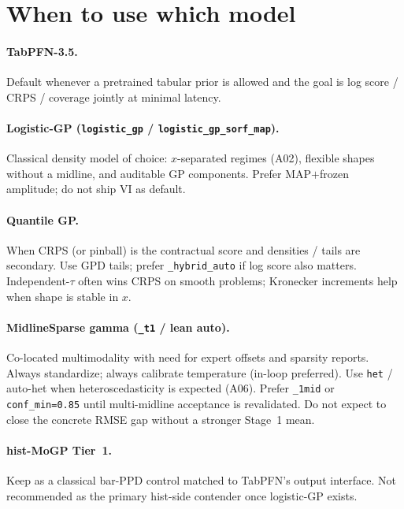 \documentclass[11pt,a4paper]{article}
\theoremstyle{definition}
\begin{document}
\section{When to use which model}
\label{sec:usecases}

\paragraph{TabPFN-3.5.}
Default whenever a pretrained tabular prior is allowed and the goal is
log score / CRPS / coverage jointly at minimal latency.

\paragraph{Logistic-GP (\texttt{logistic\_gp} / \texttt{logistic\_gp\_sorf\_map}).}
Classical density model of choice: $x$-separated regimes (A02), flexible
shapes without a midline, and auditable GP components. Prefer MAP$+$frozen
amplitude; do not ship VI as default.

\paragraph{Quantile GP.}
When CRPS (or pinball) is the contractual score and densities / tails are
secondary. Use GPD tails; prefer \texttt{\_hybrid\_auto} if log score also
matters. Independent-$\tau$ often wins CRPS on smooth problems; Kronecker
increments help when shape is stable in $x$.

\paragraph{MidlineSparse gamma (\texttt{\_t1} / lean auto).}
Co-located multimodality with need for expert offsets and sparsity reports.
Always standardize; always calibrate temperature (in-loop preferred). Use
\texttt{het} / auto-het when heteroscedasticity is expected (A06). Prefer
\texttt{\_1mid} or \texttt{conf\_min=0.85} until multi-midline acceptance is
revalidated. Do not expect to close the concrete RMSE gap without a stronger
Stage~1 mean.

\paragraph{hist-MoGP Tier~1.}
Keep as a classical bar-PPD control matched to TabPFN's output interface.
Not recommended as the primary hist-side contender once logistic-GP exists.
\end{document}
